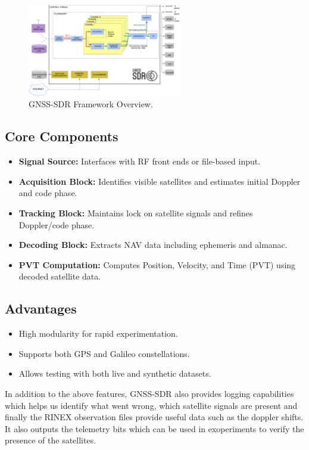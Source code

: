 \documentclass[12pt]{report}
\begin{document}
\begin{figure}[H]
    \centering
    \includegraphics[width=0.6\textwidth]{GNSS_SDR.png}
    \caption{GNSS-SDR Framework Overview.}
    \label{fig:gnss_sdr}
\end{figure}
\subsection{Core Components}
\begin{itemize}
  \item \textbf{Signal Source:} Interfaces with RF front ends or file-based input.
  \item \textbf{Acquisition Block:} Identifies visible satellites and estimates initial Doppler and code phase.
  \item \textbf{Tracking Block:} Maintains lock on satellite signals and refines Doppler/code phase.
  \item \textbf{Decoding Block:} Extracts NAV data including ephemeris and almanac.
  \item \textbf{PVT Computation:} Computes Position, Velocity, and Time (PVT) using decoded satellite data.
\end{itemize}


\subsection{Advantages}
\begin{itemize}
  \item High modularity for rapid experimentation.
  \item Supports both GPS and Galileo constellations.
  \item Allows testing with both live and synthetic datasets.
\end{itemize}

In addition to the above features, GNSS-SDR also provides logging capabilities which helps us identify what went wrong, which satellite signals are present and finally the RINEX observation files
provide useful data such as the doppler shifts. It also outputs the telemetry bits which can be used in exoperiments to verify the presence of the satellites.
\end{document}
